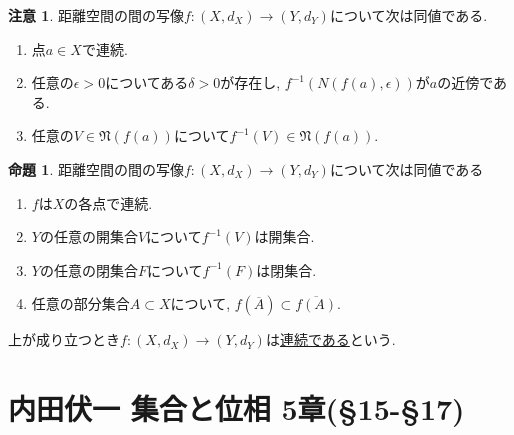 \documentclass[dvipdfmx,a4paper,11pt]{article}
\theoremstyle{definition}
\newtheorem{prop}[thm]{命題}
\newtheorem{rem}[thm]{注意}
\begin{document}
 \begin{rem}
距離空間の間の写像$f : (X, d_X) \rightarrow (Y, d_Y)$について次は同値である.
 \begin{enumerate}
  \setlength{\parskip}{0cm} 
  \setlength{\itemsep}{0cm} 
 \item 点$a \in X$で連続.
 \item 任意の$\epsilon>0$についてある$\delta >0$が存在し, $f^{-1}(N(f(a), \epsilon))$が$a$の近傍である.
 \item 任意の$V\in \mathfrak{N}(f(a))$について$f^{-1}(V) \in \mathfrak{N}(f(a))$.
 \end{enumerate}
 \end{rem}

   \begin{tcolorbox}[
    colback = white,
    colframe = green!35!black,
    fonttitle = \bfseries,
    breakable = true]
    \begin{prop}
    距離空間の間の写像$f : (X, d_X) \rightarrow (Y, d_Y)$について次は同値である
    \begin{enumerate}
     \setlength{\parskip}{0cm} 
  \setlength{\itemsep}{0cm} 
    \item $f$は$X$の各点で連続.
    \item $Y$の任意の開集合$V$について$f^{-1}(V)$は開集合.
    \item  $Y$の任意の閉集合$F$について$f^{-1}(F)$は閉集合.
    \item 任意の部分集合$A \subset X$について, $f(\overline{A}) \subset \overline{f(A)}$.
    \end{enumerate}
   上が成り立つとき$f : (X, d_X) \rightarrow (Y, d_Y)$は\underline{連続である}という.
  \end{prop}
 \end{tcolorbox}

\newpage

\section{内田伏一 集合と位相 5章(\S15-\S17)}
\end{document}
